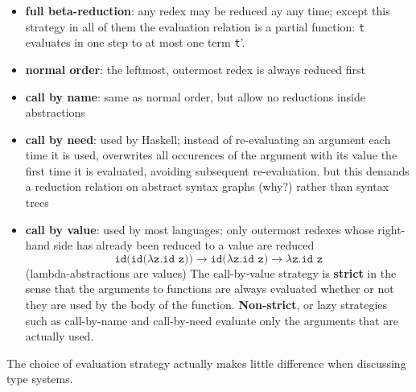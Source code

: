\documentclass{article}
\begin{document}
\begin{itemize}
\item \textbf{full beta-reduction}: any redex may be reduced ay any time; except this strategy in all of them the evaluation relation is a partial function: \texttt{t} evaluates in one step to at most one term \texttt{t}'.
\item \textbf{normal order}: the leftmost, outermost redex is always reduced first
\item \textbf{call by name}: same as normal order, but allow no reductions inside abstractions
\item \textbf{call by need}: used by Haskell; instead of re-evaluating an argument each time it is used, overwrites all occurences of the argument with its value the first time it is evaluated, avoiding subsequent re-evaluation.
    but this demands a reduction relation on abstract syntax graphs (why?) rather than syntax trees
\item \textbf{call by value}: used by most languages; only outermost redexes whose right-hand side has already been reduced to a value are reduced
    \[\texttt{id(id(}\lambda \texttt{z.id z))}\to \texttt{id(}\lambda \texttt{z.id z)}\to \lambda \texttt{z.id z}\]
    (lambda-abstractions are values) The call-by-value strategy is \textbf{strict} in the sense that the arguments to functions are always evaluated whether or not they are used by the body of the function. \textbf{Non-strict}, or lazy strategies such as call-by-name and call-by-need evaluate only the arguments that are actually used.
\end{itemize}
The choice of evaluation strategy actually makes little difference when discussing type systems.
\end{document}
